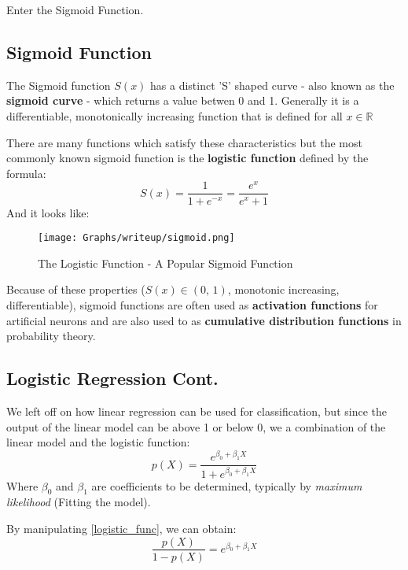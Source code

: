 \documentclass{article}
\newcommand{\R}{\mathbb{R}}
\numberwithin{equation}{subsection}
\begin{document}
Enter the Sigmoid Function.

\subsection{Sigmoid Function}
The Sigmoid function $S(x)$ has a distinct 'S' shaped curve - also known as the \textbf{sigmoid curve} -
which returns a value betwen 0 and 1. Generally it is a differentiable, monotonically increasing 
function that is defined for all $x \in \R$

There are many functions which satisfy these characteristics but the most commonly known
sigmoid function is the \textbf{logistic function} defined by the formula:
\begin{equation}
S(x) = \frac{1}{1+e^{-x}} = \frac{e^{x}}{e^{x} + 1}
\end{equation}
And it looks like: 

\begin{figure}[H]
    \centering
    \texttt{[image: Graphs/writeup/sigmoid.png]}
    \caption{The Logistic Function - A Popular Sigmoid Function}
    \label{fig:sigmoid}
\end{figure}

Because of these properties ($S(x) \in (\text{0, 1})$, monotonic increasing, differentiable), sigmoid functions
are often used as \textbf{activation functions} for artificial neurons and are also used
to as \textbf{cumulative distribution functions} in probability theory.

\subsection{Logistic Regression Cont.}
We left off on how linear regression can be used for classification, but since the output 
of the linear model can be above 1 or below 0, we a combination of the linear model and
the logistic function:
\begin{equation}
p(X) = \dfrac{e^{\beta_{0} + \beta_{1}X}}{1 + e^{\beta_{0}+\beta_{1}X}} \label{logistic_func}
\end{equation}
Where $\beta_0$ and $\beta_1$ are coefficients to be determined, typically by 
\textit{maximum likelihood} (Fitting the model).

By manipulating \eqref{logistic_func}, we can obtain:
\begin{equation}
\dfrac{p(X)}{1-p(X)} = e^{\beta_{0} + \beta_{1}X} \label{odds}
\end{equation}
\end{document}
